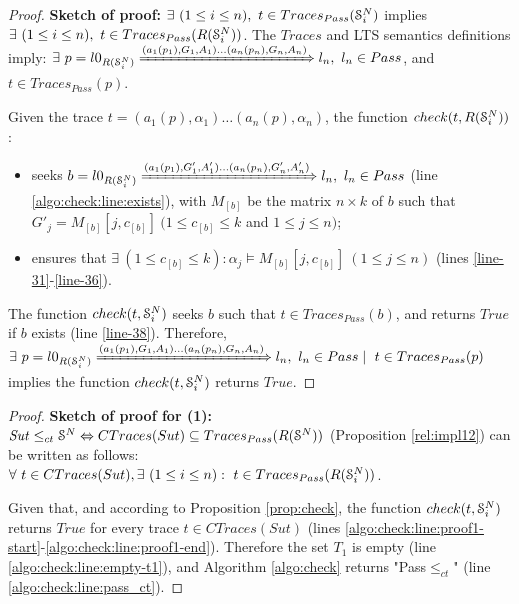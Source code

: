 \begin{proof}
    \textbf{Sketch of proof:} $\exists ~(1 \leq i \leq n), ~t \in
    Traces_{Pass}(\EuScript{S}_i^{N})$ implies $\exists ~(1 \leq i
    \leq n), ~t \in Traces_{Pass}(R(\EuScript{S}_i^{N}))$.
    The $Traces$ and LTS semantics definitions imply: $\exists
    ~p = l0_{R(\EuScript{S}_i^{N})} \xRightarrow{(a_1(p_1),G_{1},A_{1}) \dots
    (a_n(p_n),G_{n},A_{n})} l_n, ~l_n \in Pass$, and $t \in
    Traces_{Pass}(p)$.

    Given the trace $t = (a_1(p), \alpha_1) \dots (a_n(p),
    \alpha_n)$, the function $check(t, R(\EuScript{S}_i^{N}))$:

    \begin{itemize}
        \item seeks $b = l0_{R(\EuScript{S}_i^{N})}
            \xRightarrow{(a_1(p_1),G'_{1},A'_{1}) \dots
            (a_n(p_n),G'_{n},A'_{n})} l_n, ~l_n \in Pass$ (line
            \ref{algo:check:line:exists}), with $M_{[b]}$ be
            the matrix $n \times k$ of $b$ such that $G'_j =
            M_{[b]}[j, c_{[b]}] ~(1 \leq c_{[b]} \leq k$ and
            $1 \leq j \leq n)$;

        \item ensures that $\exists ~(1 \leq c_{[b]} \leq k) :
            \alpha_j \models M_{[b]}[j, c_{[b]}] ~(1
            \leq j \leq n)$ (lines \ref{line-31}-\ref{line-36}).
    \end{itemize}

    The function $check(t, \EuScript{S}_i^N)$ seeks $b$ such that $t \in
    Traces_{Pass}(b)$, and returns $True$ if $b$ exists (line
    \ref{line-38}).
    Therefore, $\exists ~p = l0_{R(\EuScript{S}_i^{N})}
    \xRightarrow{(a_1(p_1),G_{1},A_{1}) \dots
    (a_n(p_n),G_{n},A_{n})} l_n, ~l_n \in Pass \mid ~t \in
    Traces_{Pass}(p)$ implies the function $check(t,
    \EuScript{S}_i^N)$ returns $True$.
\end{proof}


\begin{proof}
    \textbf{Sketch of proof for (1):} $\mathit{Sut} \leq_{ct} \EuScript{S}^{N}
    \Leftrightarrow CTraces(Sut) \subseteq Traces_{Pass}(R(\EuScript{S}^N))$
    (Proposition \ref{rel:impl12}) can be written as
    follows: $\forall ~t \in CTraces(Sut), \exists ~(1
    \leq i \leq n) : ~t \in Traces_{Pass}(R(\EuScript{S}_i^{N}))$.

    Given that, and according to Proposition
    \ref{prop:check}, the function $check(t, \EuScript{S}_i^N)$ returns $True$ for
    every trace $t \in CTraces(Sut)$ (lines
    \ref{algo:check:line:proof1-start}-\ref{algo:check:line:proof1-end}).
    Therefore the set $T_1$ is empty (line
    \ref{algo:check:line:empty-t1}), and Algorithm
    \ref{algo:check} returns "Pass$\leq_{ct}$" (line
    \ref{algo:check:line:pass_ct}).
\end{proof}

